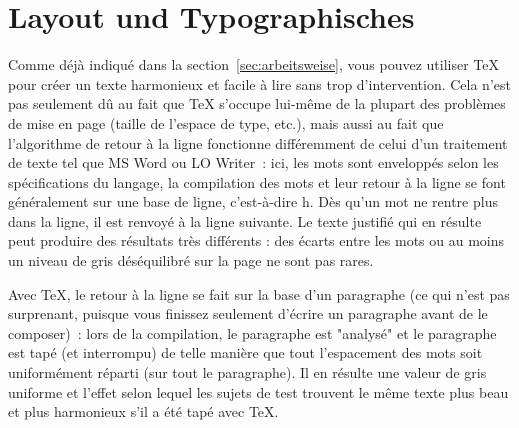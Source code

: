\documentclass[11pt,a4paper,ngerman,french,DIV=8]{scrartcl}
\begin{document}
\section{Layout und Typographisches}\label{sec:layout}

Comme déjà indiqué dans la section~\ref{sec:arbeitsweise}, vous pouvez utiliser \TeX{} pour créer un texte harmonieux et facile à lire sans trop d'intervention. Cela n'est pas seulement dû au fait que \TeX{} s'occupe lui-même de la plupart des problèmes de mise en page (taille de l'espace de type, etc.), mais aussi au fait que l'algorithme de retour à la ligne fonctionne différemment de celui d'un traitement de texte tel que MS Word ou LO Writer : ici, les mots sont enveloppés selon les spécifications du langage, la compilation des mots et leur retour à la ligne se font généralement sur une base de ligne, c'est-à-dire h. Dès qu'un mot ne rentre plus dans la ligne, il est renvoyé à la ligne suivante. Le texte justifié qui en résulte peut produire des résultats très différents : des écarts entre les mots ou au moins un niveau de gris déséquilibré sur la page ne sont pas rares.

Avec \TeX{}, le retour à la ligne se fait sur la base d'un paragraphe (ce qui n'est pas surprenant, puisque vous finissez seulement d'écrire un paragraphe avant de le composer) : lors de la compilation, le paragraphe est "analysé" et le paragraphe est tapé (et interrompu) de telle manière que tout l'espacement des mots soit uniformément réparti (sur tout le paragraphe). Il en résulte une valeur de gris uniforme et l'effet selon lequel les sujets de test trouvent le même texte plus beau et plus harmonieux s'il a été tapé avec \TeX{}.
\end{document}
